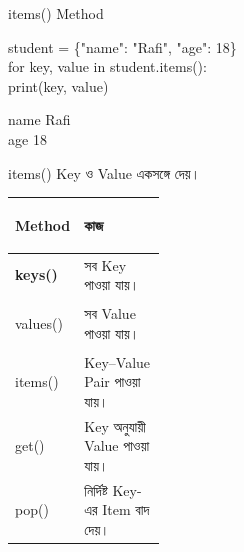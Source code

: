 \begin{codeoutputbox}{\textenglish{\ttfamily items()} Method}

\noindent
\begin{minipage}[t]{0.56\linewidth}
\codeheading

\begin{english}
\ttfamily
student = \{"name": "Rafi", "age": 18\}\\
for key, value in student.items():\\
\hspace*{4mm}print(key, value)
\end{english}

\end{minipage}
\hfill
\begin{minipage}[t]{0.40\linewidth}
\outputheading

\begin{english}
\ttfamily
name Rafi\\
age 18
\end{english}

\medskip

\textenglish{\ttfamily items()}
Key ও Value একসঙ্গে দেয়।

\end{minipage}

\end{codeoutputbox}



\begin{tabularx}
{\linewidth}
{
|>{\bfseries\RaggedRight\arraybackslash}p{0.30\linewidth}
|Y|
}

\hline
{}

\textbf{Method}
&
\textbf{কাজ}
\\
\hline

\textenglish{\ttfamily keys()}
&
সব Key পাওয়া যায়।
\\
\hline

\textenglish{\ttfamily values()}
&
সব Value পাওয়া যায়।
\\
\hline

\textenglish{\ttfamily items()}
&
Key--Value Pair পাওয়া যায়।
\\
\hline

\textenglish{\ttfamily get()}
&
Key অনুযায়ী Value পাওয়া যায়।
\\
\hline

\textenglish{\ttfamily pop()}
&
নির্দিষ্ট Key-এর Item বাদ দেয়।
\\
\hline

\end{tabularx}

